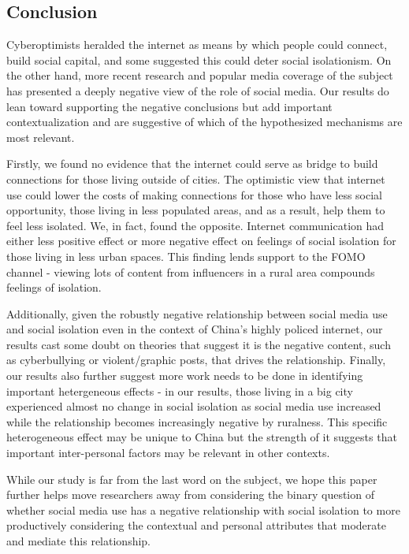 \documentclass[]{interact}
\theoremstyle{plain}%
\theoremstyle{definition}
\theoremstyle{remark}
\begin{document}
\hypertarget{conclusion}{%
\subsection{Conclusion}\label{conclusion}}

Cyberoptimists heralded the internet as means by which people could
connect, build social capital, and some suggested this could deter
social isolationism. On the other hand, more recent research and popular
media coverage of the subject has presented a deeply negative view of
the role of social media. Our results do lean toward supporting the
negative conclusions but add important contextualization and are
suggestive of which of the hypothesized mechanisms are most relevant.

Firstly, we found no evidence that the internet could serve as bridge to
build connections for those living outside of cities. The optimistic
view that internet use could lower the costs of making connections for
those who have less social opportunity, those living in less populated
areas, and as a result, help them to feel less isolated. We, in fact,
found the opposite. Internet communication had either less positive
effect or more negative effect on feelings of social isolation for those
living in less urban spaces. This finding lends support to the FOMO
channel - viewing lots of content from influencers in a rural area
compounds feelings of isolation.

Additionally, given the robustly negative relationship between social
media use and social isolation even in the context of China's highly
policed internet, our results cast some doubt on theories that suggest
it is the negative content, such as cyberbullying or violent/graphic
posts, that drives the relationship. Finally, our results also further
suggest more work needs to be done in identifying important hetergeneous
effects - in our results, those living in a big city experienced almost
no change in social isolation as social media use increased while the
relationship becomes increasingly negative by ruralness. This specific
heterogeneous effect may be unique to China but the strength of it
suggests that important inter-personal factors may be relevant in other
contexts.

While our study is far from the last word on the subject, we hope this
paper further helps move researchers away from considering the binary
question of whether social media use has a negative relationship with
social isolation to more productively considering the contextual and
personal attributes that moderate and mediate this relationship.
\end{document}
